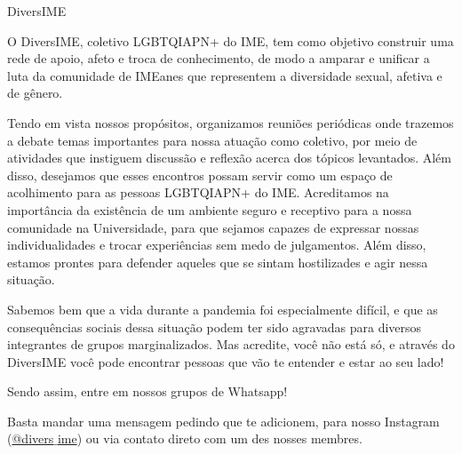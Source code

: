 \begin{subsecao}{DiversIME}

O DiversIME, coletivo LGBTQIAPN+ do IME, tem como objetivo construir uma rede de
apoio, afeto e troca de conhecimento, de modo a amparar e unificar a luta da
comunidade de IMEanes que representem a diversidade sexual, afetiva e de gênero. 

Tendo em vista nossos propósitos, organizamos reuniões periódicas onde trazemos
a debate temas importantes para nossa atuação como coletivo, por meio de
atividades que instiguem discussão e reflexão acerca dos tópicos levantados.
Além disso, desejamos que esses encontros possam servir como um espaço de
acolhimento para as pessoas LGBTQIAPN+ do IME. Acreditamos na importância da
existência de um ambiente seguro e receptivo para a nossa comunidade na
Universidade, para que sejamos capazes de expressar nossas individualidades
e trocar experiências sem medo de julgamentos. Além disso, estamos prontes
para defender aqueles que se sintam hostilizades e agir nessa situação. 

Sabemos bem que a vida durante a pandemia foi especialmente difícil, e que as 
consequências sociais dessa situação podem ter sido agravadas para diversos integrantes
de grupos marginalizados. Mas acredite, você não está só, e através do DiversIME
você pode encontrar pessoas que vão te entender e estar ao seu lado!

Sendo assim, entre em nossos grupos de Whatsapp!

Basta mandar uma mensagem pedindo que te adicionem, para nosso Instagram
(\href{https://www.instagram.com/divers_ime/}{@divers$\_$ime}) ou via contato direto 
com um des nosses membres.

\end{subsecao}
